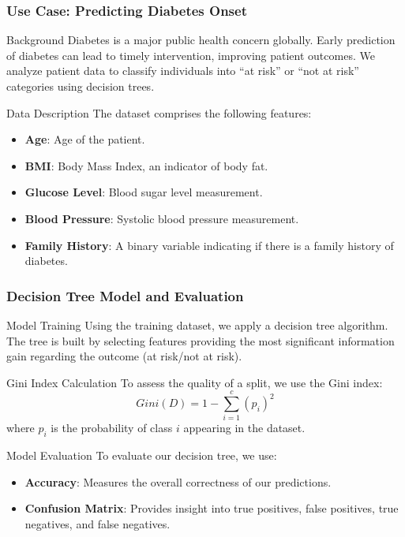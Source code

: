 \documentclass[aspectratio=169]{beamer}
\begin{document}
\begin{frame}
    \frametitle{Use Case: Predicting Diabetes Onset}

    \begin{block}{Background}
        Diabetes is a major public health concern globally. 
        Early prediction of diabetes can lead to timely intervention, improving patient outcomes. 
        We analyze patient data to classify individuals into “at risk” or “not at risk” categories using decision trees.
    \end{block}

    \begin{block}{Data Description}
        The dataset comprises the following features:
        \begin{itemize}
            \item \textbf{Age}: Age of the patient.
            \item \textbf{BMI}: Body Mass Index, an indicator of body fat.
            \item \textbf{Glucose Level}: Blood sugar level measurement.
            \item \textbf{Blood Pressure}: Systolic blood pressure measurement.
            \item \textbf{Family History}: A binary variable indicating if there is a family history of diabetes.
        \end{itemize}
    \end{block}
\end{frame}

\begin{frame}[fragile]
    \frametitle{Decision Tree Model and Evaluation}

    \begin{block}{Model Training}
        Using the training dataset, we apply a decision tree algorithm. 
        The tree is built by selecting features providing the most significant information gain regarding the outcome (at risk/not at risk).
    \end{block}

    \begin{block}{Gini Index Calculation}
        To assess the quality of a split, we use the Gini index:
        \begin{equation}
            Gini(D) = 1 - \sum_{i=1}^{c} (p_i)^2
        \end{equation}
        where \(p_i\) is the probability of class \(i\) appearing in the dataset.
    \end{block}
    
    \begin{block}{Model Evaluation}
        To evaluate our decision tree, we use:
        \begin{itemize}
            \item \textbf{Accuracy}: Measures the overall correctness of our predictions.
            \item \textbf{Confusion Matrix}: Provides insight into true positives, false positives, true negatives, and false negatives.
        \end{itemize}
    \end{block}
\end{frame}
\end{document}

